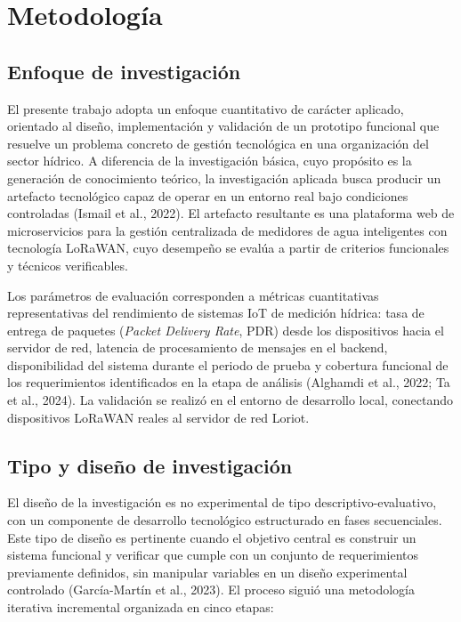 \documentclass[12pt,a4paper,oneside]{report}
\begin{document}
\chapter{Metodología}

\section{Enfoque de investigación}

El presente trabajo adopta un enfoque cuantitativo de carácter aplicado, orientado al diseño, implementación y validación de un prototipo funcional que resuelve un problema concreto de gestión tecnológica en una organización del sector hídrico. A diferencia de la investigación básica, cuyo propósito es la generación de conocimiento teórico, la investigación aplicada busca producir un artefacto tecnológico capaz de operar en un entorno real bajo condiciones controladas (Ismail et al., 2022). El artefacto resultante es una plataforma web de microservicios para la gestión centralizada de medidores de agua inteligentes con tecnología LoRaWAN, cuyo desempeño se evalúa a partir de criterios funcionales y técnicos verificables.

Los parámetros de evaluación corresponden a métricas cuantitativas representativas del rendimiento de sistemas IoT de medición hídrica: tasa de entrega de paquetes (\textit{Packet Delivery Rate}, PDR) desde los dispositivos hacia el servidor de red, latencia de procesamiento de mensajes en el backend, disponibilidad del sistema durante el periodo de prueba y cobertura funcional de los requerimientos identificados en la etapa de análisis (Alghamdi et al., 2022; Ta et al., 2024). La validación se realizó en el entorno de desarrollo local, conectando dispositivos LoRaWAN reales al servidor de red Loriot.

\section{Tipo y diseño de investigación}

El diseño de la investigación es no experimental de tipo descriptivo-evaluativo, con un componente de desarrollo tecnológico estructurado en fases secuenciales. Este tipo de diseño es pertinente cuando el objetivo central es construir un sistema funcional y verificar que cumple con un conjunto de requerimientos previamente definidos, sin manipular variables en un diseño experimental controlado (García-Martín et al., 2023). El proceso siguió una metodología iterativa incremental organizada en cinco etapas:
\end{document}
